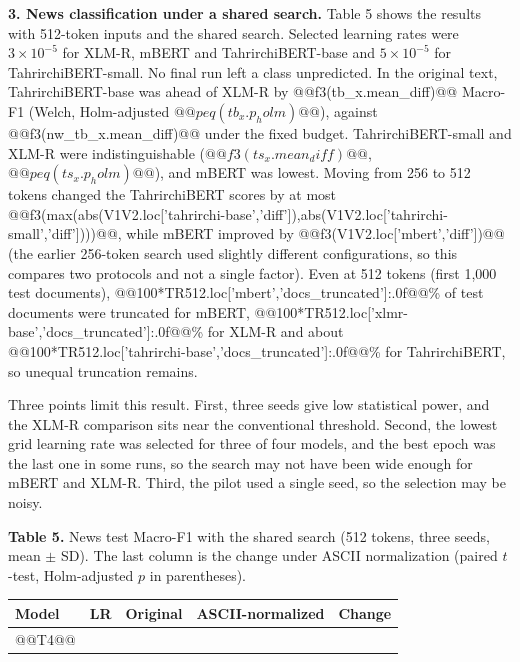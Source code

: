 \documentclass[11pt]{book}
\begin{document}
\textbf{3. News classification under a shared search.} Table 5 shows the results with 512-token inputs and the shared search. Selected learning rates were $3\times10^{-5}$ for XLM-R, mBERT and TahrirchiBERT-base and $5\times10^{-5}$ for TahrirchiBERT-small. No final run left a class unpredicted. In the original text, TahrirchiBERT-base was ahead of XLM-R by @@f3(tb_x.mean_diff)@@ Macro-F1 (Welch, Holm-adjusted $@@peq(tb_x.p_holm)@@$), against @@f3(nw_tb_x.mean_diff)@@ under the fixed budget. TahrirchiBERT-small and XLM-R were indistinguishable ($@@f3(ts_x.mean_diff)@@$, $@@peq(ts_x.p_holm)@@$), and mBERT was lowest. Moving from 256 to 512 tokens changed the TahrirchiBERT scores by at most @@f3(max(abs(V1V2.loc['tahrirchi-base','diff']),abs(V1V2.loc['tahrirchi-small','diff'])))@@, while mBERT improved by @@f3(V1V2.loc['mbert','diff'])@@ (the earlier 256-token search used slightly different configurations, so this compares two protocols and not a single factor). Even at 512 tokens (first 1,000 test documents), @@100*TR512.loc['mbert','docs_truncated']:.0f@@\% of test documents were truncated for mBERT, @@100*TR512.loc['xlmr-base','docs_truncated']:.0f@@\% for XLM-R and about @@100*TR512.loc['tahrirchi-base','docs_truncated']:.0f@@\% for TahrirchiBERT, so unequal truncation remains.

Three points limit this result. First, three seeds give low statistical power, and the XLM-R comparison sits near the conventional threshold. Second, the lowest grid learning rate was selected for three of four models, and the best epoch was the last one in some runs, so the search may not have been wide enough for mBERT and XLM-R. Third, the pilot used a single seed, so the selection may be noisy.

\begin{center}
\textbf{Table 5.} News test Macro-F1 with the shared search (512 tokens, three seeds, mean $\pm$ SD). The last column is the change under ASCII normalization (paired $t$-test, Holm-adjusted $p$ in parentheses).\\[2pt]
\begin{tabular}{lcccc}
\hline
Model & LR & Original & ASCII-normalized & Change \\
\hline
@@T4@@
\hline
\end{tabular}
\end{center}
\end{document}
